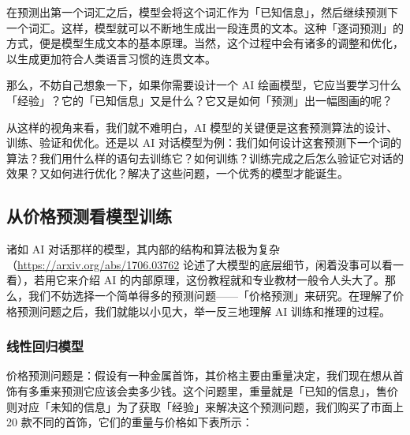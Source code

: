 在预测出第一个词汇之后，模型会将这个词汇作为「已知信息」，然后继续预测下一个词汇。这样，模型就可以不断地生成出一段连贯的文本。这种「逐词预测」的方式，便是模型生成文本的基本原理。当然，这个过程中会有诸多的调整和优化，以生成更加符合人类语言习惯的连贯文本。

\begin{note}
  那么，不妨自己想象一下，如果你需要设计一个 AI 绘画模型，它应当要学习什么「经验」？它的「已知信息」又是什么？它又是如何「预测」出一幅图画的呢？
\end{note}

从这样的视角来看，我们就不难明白，AI 模型的关键便是这套预测算法的设计、训练、验证和优化。还是以 AI 对话模型为例：我们如何设计这套预测下一个词的算法？我们用什么样的语句去训练它？如何训练？训练完成之后怎么验证它对话的效果？又如何进行优化？解决了这些问题，一个优秀的模型才能诞生。

\subsection{从价格预测看模型训练}

诸如 AI 对话那样的模型，其内部的结构和算法极为复杂（\url{https://arxiv.org/abs/1706.03762} 论述了大模型的底层细节，闲着没事可以看一看），若用它来介绍 AI 的内部原理，这份教程就和专业教材一般令人头大了。那么，我们不妨选择一个简单得多的预测问题——「价格预测」来研究。在理解了价格预测问题之后，我们就能以小见大，举一反三地理解 AI 训练和推理的过程。

\subsubsection{线性回归模型}

价格预测问题是：假设有一种金属首饰，其价格主要由重量决定，我们现在想从首饰有多重来预测它应该会卖多少钱。这个问题里，重量就是「已知的信息」，售价则对应「未知的信息」为了获取「经验」来解决这个预测问题，我们购买了市面上 20 款不同的首饰，它们的重量与价格如下表所示：

